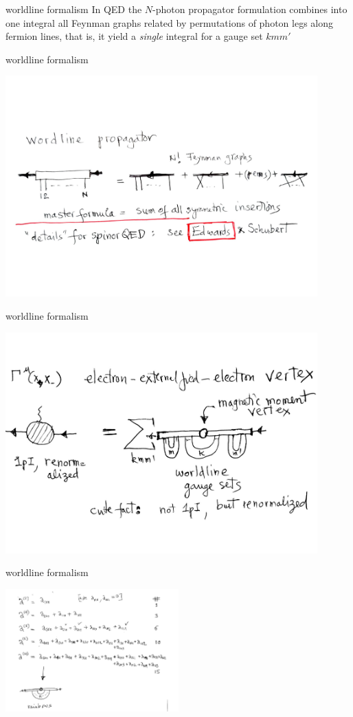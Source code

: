 \begin{frame}{worldline formalism}
In QED the $N$-photon propagator formulation combines into one integral
all Feynman graphs related by permutations of photon legs along fermion
lines, that is, it yield a \emph{single} integral for a gauge set
$kmm'$
\end{frame}

\begin{frame}{worldline formalism}
\begin{center}
\includegraphics[width=0.90\textwidth]{worldlinProp}
\end{center}
\end{frame}
\begin{frame}{worldline formalism}
\begin{center}
\includegraphics[width=0.90\textwidth]{worldlineGsets}
\end{center}
\end{frame}
\begin{frame}{worldline formalism}
\begin{center}
\includegraphics[width=0.50\textwidth]{gaugeSets}
\end{center}
\end{frame}
